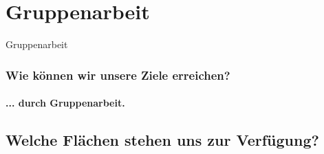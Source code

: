 \documentclass[aspectratio=169]{beamer}
\begin{document}


\section{Gruppenarbeit}

\begin{frame}{Gruppenarbeit}
	\frametitle{Wie können wir unsere Ziele erreichen?} 
	\framesubtitle{... durch Gruppenarbeit.}
\end{frame}
\subsection[Flächen]{Welche Flächen stehen uns zur Verfügung?}
\end{document}
